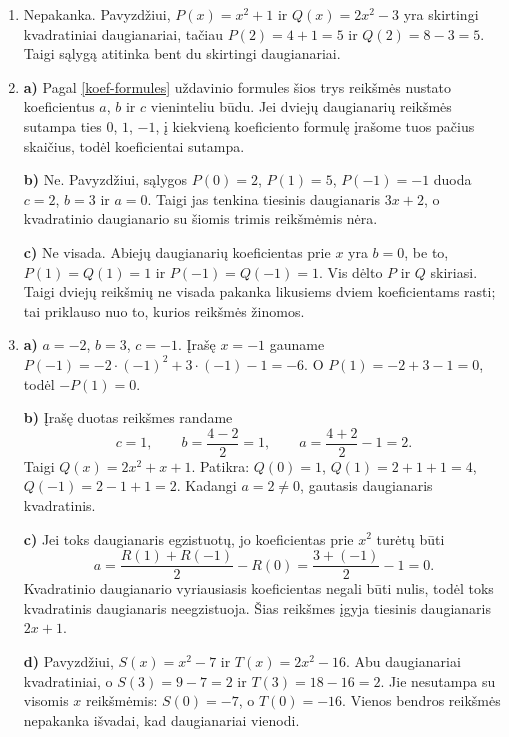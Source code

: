 \documentclass[12pt,a4paper]{exam}
\begin{document}
\begin{enumerate}
\textbf{d)} $P(x)=-x^2+bx+c$. Sąlygos duoda
\[
\begin{cases}-1-b+c=2,\\-4+2b+c=-1,\end{cases}
\qquad\text{arba}\qquad
\begin{cases}-b+c=3,\\2b+c=3.\end{cases}
\]
Atėmę pirmąją lygtį iš antrosios, gauname $3b=0$, todėl $b=0$, $c=3$. Taigi $P(x)=-x^2+3$. Patikra: $P(-1)=2$, $P(2)=-1$.

\textbf{e)} $P(x)=ax^2+bx-2$, todėl $P(1)=a+b-2$, o $P(-1)=a-b-2$. Iš duotos sumos ir skirtumo gauname sistemą
\[
\begin{cases}2a-4=4,\\2b=6.\end{cases}
\]
Taigi $a=4$, $b=3$ ir $P(x)=4x^2+3x-2$. Patikra: $P(1)=5$, $P(-1)=-1$; jų suma $4$, skirtumas $6$.
\item Nepakanka. Pavyzdžiui, $P(x)=x^2+1$ ir $Q(x)=2x^2-3$ yra skirtingi kvadratiniai daugianariai, tačiau $P(2)=4+1=5$ ir $Q(2)=8-3=5$. Taigi sąlygą atitinka bent du skirtingi daugianariai.
\item \textbf{a)} Pagal \ref{koef-formules} uždavinio formules šios trys reikšmės nustato koeficientus $a$, $b$ ir $c$ vieninteliu būdu. Jei dviejų daugianarių reikšmės sutampa ties $0$, $1$, $-1$, į kiekvieną koeficiento formulę įrašome tuos pačius skaičius, todėl koeficientai sutampa.

\textbf{b)} Ne. Pavyzdžiui, sąlygos $P(0)=2$, $P(1)=5$, $P(-1)=-1$ duoda $c=2$, $b=3$ ir $a=0$. Taigi jas tenkina tiesinis daugianaris $3x+2$, o kvadratinio daugianario su šiomis trimis reikšmėmis nėra.

\textbf{c)} Ne visada. Abiejų daugianarių koeficientas prie $x$ yra $b=0$, be to, $P(1)=Q(1)=1$ ir $P(-1)=Q(-1)=1$. Vis dėlto $P$ ir $Q$ skiriasi. Taigi dviejų reikšmių ne visada pakanka likusiems dviem koeficientams rasti; tai priklauso nuo to, kurios reikšmės žinomos.
\item \textbf{a)} $a=-2$, $b=3$, $c=-1$. Įrašę $x=-1$ gauname $P(-1)=-2\cdot(-1)^2+3\cdot(-1)-1=-6$. O $P(1)=-2+3-1=0$, todėl $-P(1)=0$.

\textbf{b)} Įrašę duotas reikšmes randame
\[
c=1,\qquad b=\frac{4-2}{2}=1,\qquad a=\frac{4+2}{2}-1=2.
\]
Taigi $Q(x)=2x^2+x+1$. Patikra: $Q(0)=1$, $Q(1)=2+1+1=4$, $Q(-1)=2-1+1=2$. Kadangi $a=2\ne0$, gautasis daugianaris kvadratinis.

\textbf{c)} Jei toks daugianaris egzistuotų, jo koeficientas prie $x^2$ turėtų būti
\[
a=\frac{R(1)+R(-1)}{2}-R(0)=\frac{3+(-1)}{2}-1=0.
\]
Kvadratinio daugianario vyriausiasis koeficientas negali būti nulis, todėl toks kvadratinis daugianaris neegzistuoja. Šias reikšmes įgyja tiesinis daugianaris $2x+1$.

\textbf{d)} Pavyzdžiui, $S(x)=x^2-7$ ir $T(x)=2x^2-16$. Abu daugianariai kvadratiniai, o $S(3)=9-7=2$ ir $T(3)=18-16=2$. Jie nesutampa su visomis $x$ reikšmėmis: $S(0)=-7$, o $T(0)=-16$. Vienos bendros reikšmės nepakanka išvadai, kad daugianariai vienodi.
\end{enumerate}
\end{document}
